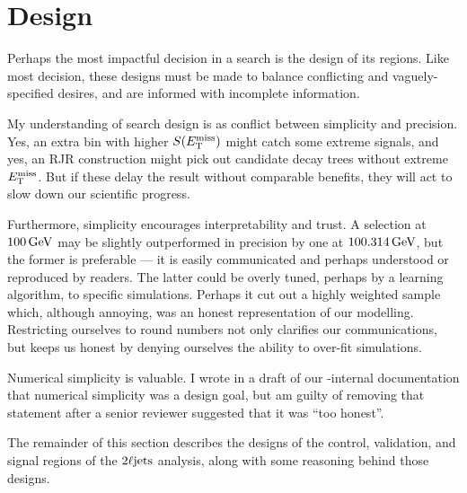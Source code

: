 \FloatBarrier
\section{Design}
\label{sec:2ljets_design}
Perhaps the most impactful decision in a search is the design of its regions.
Like most decision, these designs must be made to balance conflicting and
vaguely-specified desires, and are informed with incomplete information.

My understanding of search design is as conflict between simplicity and
precision.
Yes, an extra bin with higher $\metsig$ might catch some extreme signals,
and yes, an RJR construction might pick out candidate decay trees without
extreme $\met$.
But if these delay the result without comparable benefits, they will act to
slow down our scientific progress.

Furthermore, simplicity encourages interpretability and trust.
A selection at $100\,\eV[G]$ may be slightly outperformed in precision by one
at $100.314\,\eV[G]$, but the former is preferable --- it is easily
communicated and perhaps understood or reproduced by readers.
The latter could be overly tuned, perhaps by a learning algorithm, to specific
simulations.
Perhaps it cut out a highly weighted sample which, although annoying, was an
honest representation of our modelling.
Restricting ourselves to round numbers not only clarifies our communications,
but keeps us honest by denying ourselves the ability to over-fit simulations.

Numerical simplicity is valuable.
I wrote in a draft of our \atlas-internal documentation that numerical
simplicity was a design goal, but am guilty of removing that statement after a
senior reviewer suggested that it was ``too honest''.

The remainder of this section describes the designs of the control,
validation, and signal regions of the $\twoljets$ analysis, along with some
reasoning behind those designs.

